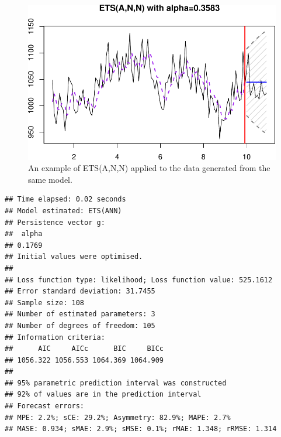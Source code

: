 \documentclass[
]{book}
\newenvironment{Shaded}{\begin{snugshade}}{\end{snugshade}}
\newcommand{\AttributeTok}[1]{\textcolor[rgb]{0.77,0.63,0.00}{#1}}
\newcommand{\CommentTok}[1]{\textcolor[rgb]{0.56,0.35,0.01}{\textit{#1}}}
\newcommand{\ConstantTok}[1]{\textcolor[rgb]{0.00,0.00,0.00}{#1}}
\newcommand{\DecValTok}[1]{\textcolor[rgb]{0.00,0.00,0.81}{#1}}
\newcommand{\FloatTok}[1]{\textcolor[rgb]{0.00,0.00,0.81}{#1}}
\newcommand{\FunctionTok}[1]{\textcolor[rgb]{0.00,0.00,0.00}{#1}}
\newcommand{\NormalTok}[1]{#1}
\newcommand{\OtherTok}[1]{\textcolor[rgb]{0.56,0.35,0.01}{#1}}
\newcommand{\SpecialCharTok}[1]{\textcolor[rgb]{0.00,0.00,0.00}{#1}}
\newcommand{\StringTok}[1]{\textcolor[rgb]{0.31,0.60,0.02}{#1}}
\theoremstyle{definition}
\theoremstyle{definition}
\theoremstyle{definition}
\theoremstyle{definition}
\theoremstyle{remark}
\begin{document}
\begin{Shaded}
\end{Shaded}

\begin{figure}
\centering
\includegraphics{Svetunkov--2022----ADAM_files/figure-latex/ETSANNExample-1.pdf}
\caption{\label{fig:ETSANNExample}An example of ETS(A,N,N) applied to the data generated from the same model.}
\end{figure}

\begin{verbatim}
## Time elapsed: 0.02 seconds
## Model estimated: ETS(ANN)
## Persistence vector g:
##  alpha 
## 0.1769 
## Initial values were optimised.
## 
## Loss function type: likelihood; Loss function value: 525.1612
## Error standard deviation: 31.7455
## Sample size: 108
## Number of estimated parameters: 3
## Number of degrees of freedom: 105
## Information criteria:
##      AIC     AICc      BIC     BICc 
## 1056.322 1056.553 1064.369 1064.909 
## 
## 95% parametric prediction interval was constructed
## 92% of values are in the prediction interval
## Forecast errors:
## MPE: 2.2%; sCE: 29.2%; Asymmetry: 82.9%; MAPE: 2.7%
## MASE: 0.934; sMAE: 2.9%; sMSE: 0.1%; rMAE: 1.348; rRMSE: 1.314
\end{verbatim}
\end{document}
